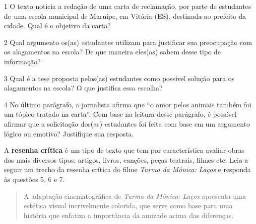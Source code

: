 \num{1} O texto noticia a redação de uma carta de reclamação, por parte
de estudantes de uma escola municipal de Maruípe, em Vitória (ES),
destinada ao prefeito da cidade. Qual é o objetivo da carta?


\num{2} Qual argumento os(as) estudantes utilizam para justificar sua
preocupação com os alagamentos na escola? De que maneira eles(as) sabem
desse tipo de informação?


\num{3} Qual é a tese proposta pelos(as) estudantes como possível
solução para os alagamentos na escola? O que justifica essa escolha?


\num{4} No último parágrafo, a jornalista afirma que ``o amor pelos
animais também foi um tópico tratado na carta''. Com base na leitura
desse parágrafo, é possível afirmar que a solicitação dos(as) estudantes
foi feita com base em um argumento lógico ou emotivo? Justifique sua
resposta.


A \textbf{resenha crítica} é um tipo de texto que tem por característica
avaliar obras dos mais diversos tipos: artigos, livros, canções, peças
teatrais, filmes etc. Leia a seguir um trecho da resenha crítica do
filme \emph{Turma da Mônica: Laços} e responda às questões 5, 6 e 7.

\begin{quote}
A adaptação cinematográfica de \emph{Turma da Mônica: Laços} apresenta
uma estética visual incrivelmente colorida, que serve como base para uma
história que enfatiza a importância da amizade acima das diferenças.
\end{quote}


